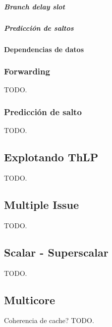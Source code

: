 \subparagraph{Branch delay slot}

\subparagraph{Predicción de saltos}

\paragraph{Dependencias de datos}
\label{par:optimizations-ilp-pipeline-data_dependencies}


\subsubsection{Forwarding}
\label{subsubsec:optimizations-ilp-forwarding}

TODO.

\subsubsection{Predicción de salto}
\label{subsubsec:optimizations-ilp-branch_prediction}

TODO.

\subsection{Explotando ThLP}
\label{subsec:optimizations-thlp}

TODO.











\subsection{Multiple Issue}
\label{subsec:optimizations-multiple_issue}

TODO.

\subsection{Scalar - Superscalar}
\label{subsec:optimizations-scalar_superscalar}

TODO.

\subsection{Multicore}
\label{subsec:optimizations-multicore}

Coherencia de cache?
TODO.

